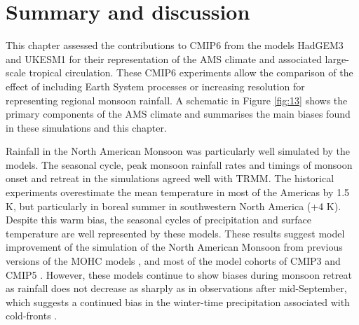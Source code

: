 \section{Summary and discussion}



 This chapter assessed the contributions to CMIP6 from the models HadGEM3 and UKESM1 for their representation of the AMS climate and associated large-scale tropical circulation. These CMIP6 experiments allow the comparison of the effect of including Earth System processes or increasing resolution for representing regional monsoon rainfall. 
A schematic in Figure \ref{fig:13} shows the primary components of the AMS climate and summarises the main biases found in these simulations and this chapter.



Rainfall in the North American Monsoon was particularly well simulated by the models. The seasonal cycle, peak monsoon rainfall rates and timings of monsoon onset and retreat in the simulations agreed well with TRMM. The historical experiments overestimate the mean temperature in most of the Americas by 1.5 K, but particularly in boreal summer in southwestern North America (+4 K). Despite this warm bias, the seasonal cycles of precipitation and surface temperature are well represented by these models.  These results suggest model improvement of the simulation of the North American Monsoon from previous versions of the MOHC models \citep{arritt2000}, and most of the model cohorts of CMIP3 and CMIP5 \citep{geil2013}. However, these models continue to show biases during monsoon retreat as rainfall does not decrease as sharply as in observations after mid-September, which suggests a continued bias in the winter-time precipitation associated with cold-fronts \citep{adams1997}. %

